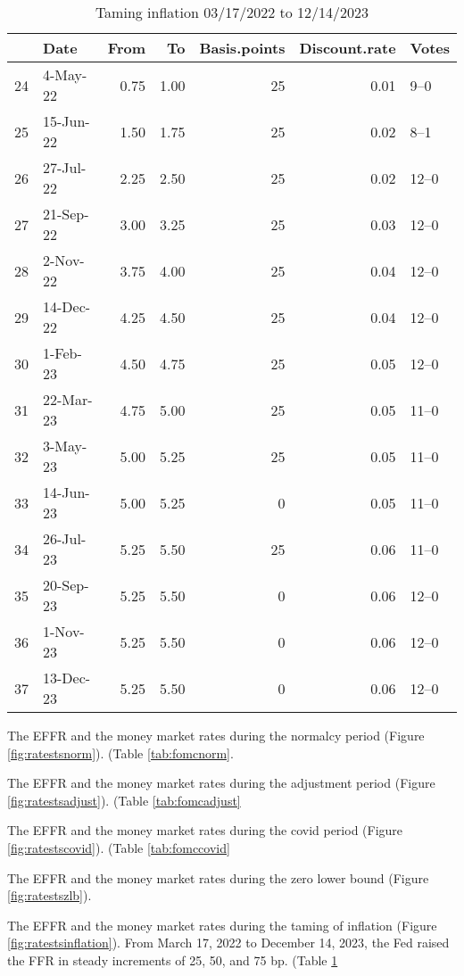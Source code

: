 \documentclass[
]{article}
\begin{document}
\begin{table}[ht]
\centering
\begin{tabular}{rlrrrrl}
  \hline
 & Date & From & To & Basis.points & Discount.rate & Votes \\ 
  \hline
24 & 4-May-22 & 0.75 & 1.00 &  25 & 0.01 & 9–0 \\ 
  25 & 15-Jun-22 & 1.50 & 1.75 &  25 & 0.02 & 8–1 \\ 
  26 & 27-Jul-22 & 2.25 & 2.50 &  25 & 0.02 & 12–0 \\ 
  27 & 21-Sep-22 & 3.00 & 3.25 &  25 & 0.03 & 12–0 \\ 
  28 & 2-Nov-22 & 3.75 & 4.00 &  25 & 0.04 & 12–0 \\ 
  29 & 14-Dec-22 & 4.25 & 4.50 &  25 & 0.04 & 12–0 \\ 
  30 & 1-Feb-23 & 4.50 & 4.75 &  25 & 0.05 & 12–0 \\ 
  31 & 22-Mar-23 & 4.75 & 5.00 &  25 & 0.05 & 11–0 \\ 
  32 & 3-May-23 & 5.00 & 5.25 &  25 & 0.05 & 11–0 \\ 
  33 & 14-Jun-23 & 5.00 & 5.25 &   0 & 0.05 & 11–0 \\ 
  34 & 26-Jul-23 & 5.25 & 5.50 &  25 & 0.06 & 11–0 \\ 
  35 & 20-Sep-23 & 5.25 & 5.50 &   0 & 0.06 & 12–0 \\ 
  36 & 1-Nov-23 & 5.25 & 5.50 &   0 & 0.06 & 12–0 \\ 
  37 & 13-Dec-23 & 5.25 & 5.50 &   0 & 0.06 & 12–0 \\ 
   \hline
\end{tabular}
\caption{Taming inflation 03/17/2022 to 12/14/2023} 
\label{tab:fomcinflation}
\end{table}

The EFFR and the money market rates during the normalcy period (Figure \ref{fig:ratestsnorm}).
(Table \ref{tab:fomcnorm}.

The EFFR and the money market rates during the adjustment period (Figure \ref{fig:ratestsadjust}).
(Table \ref{tab:fomcadjust}

The EFFR and the money market rates during the covid period (Figure \ref{fig:ratestscovid}).
(Table \ref{tab:fomccovid}

The EFFR and the money market rates during the zero lower bound (Figure \ref{fig:ratestszlb}).

The EFFR and the money market rates during the taming of inflation (Figure \ref{fig:ratestsinflation}).
From March 17, 2022 to December 14, 2023, the Fed raised the FFR in steady increments of 25, 50, and 75 bp.
(Table \ref{tab:fomcinflation}
\end{document}
